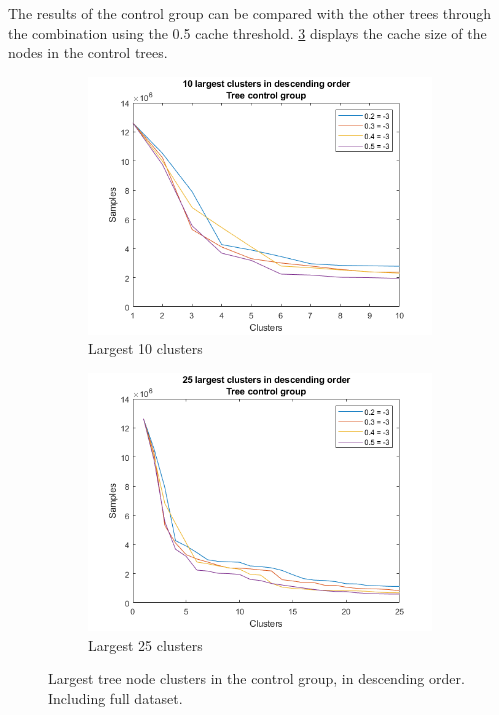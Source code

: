 The results of the control group can be compared with the other trees through the combination using the 0.5 cache threshold.
\cref{fig:tree:treecontrolcluster} displays the cache size of the nodes in the control trees.

\begin{figure}
    \centering
    \begin{subfigure}[b]{.49\textwidth}
        \centering
        \includegraphics[width=\textwidth]{figures/treecontrolcluster10.png}
        \caption{Largest 10 clusters}
        \label{sfig:tree:treecontrolcluster10}
    \end{subfigure}
    \hfill
    \begin{subfigure}[b]{.49\textwidth}
        \centering
        \includegraphics[width=\textwidth]{figures/treecontrolcluster25.png}
        \caption{Largest 25 clusters}
        \label{sfig:tree:treecontrolcluster25}
    \end{subfigure}
    \caption{Largest tree node clusters in the control group, in descending order. Including full dataset.}
    \label{fig:tree:treecontrolcluster}
\end{figure}

